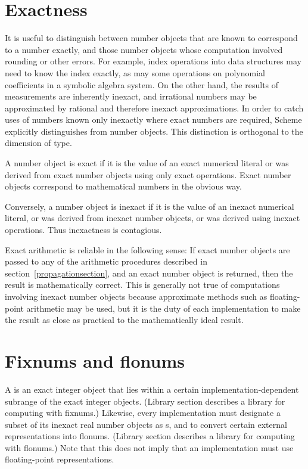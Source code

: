 \section{Exactness}
\label{exactly}

It is useful to distinguish between number objects
that are known to correspond to a number exactly, and those number
objects whose computation involved rounding or other errors.  For
example, index operations into data structures may need to know the index
exactly, as may some operations on polynomial coefficients in a symbolic algebra
system.  On the other hand, the results of measurements are inherently
inexact, and irrational numbers may be approximated by rational and
therefore inexact approximations.  In order to catch uses of numbers
known only inexactly where exact numbers are required, Scheme
explicitly distinguishes  from  number objects.  This
distinction is orthogonal to the dimension of type.

A
number object is exact if it is the value of an exact numerical
literal or was derived from exact number objects using only exact
operations.  Exact number objects correspond to mathematical numbers
in the obvious way.

Conversely, a number object is inexact if it is the value of an
inexact numerical literal, or was derived from inexact number objects,
or was derived using inexact operations.  Thus inexactness is
contagious.

Exact arithmetic is reliable in the following sense: If exact number
objects are passed to any of the arithmetic procedures described in
section~\ref{propagationsection}, and an exact number object is
returned, then the result is mathematically correct.  This is
generally not true of computations involving inexact number objects
because approximate methods such as floating-point arithmetic may be
used, but it is the duty of each implementation to make the result as
close as practical to the mathematically ideal result.

\section{Fixnums and flonums}

A  is an exact integer object that lies
within a certain implementation-dependent subrange of the
exact integer objects. (Library section  describes a
library for computing with fixnums.)
Likewise, every implementation must
designate a subset of its inexact real number objects as s, and
to convert certain external representations into flonums.  
(Library section  describes a library for
computing with flonums.)  Note that
this does not imply that an implementation must use
floating-point representations.

